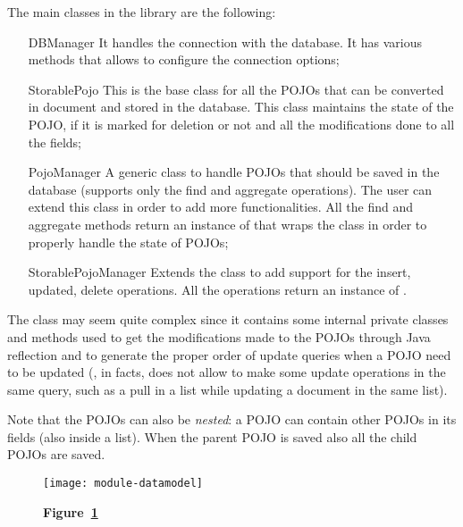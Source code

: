 The main classes in the library are the following:
\begin{itemize}
	\item[DBManager] It handles the connection with the database. It has
		various methods that allows to configure the connection options;
	\item[StorablePojo] This is the base class for all the POJOs that can be
		converted in document and stored in the database. This class
		maintains the state of the POJO, if it is marked for deletion or
		not and all the modifications done to all the fields;
	\item[PojoManager] A generic class to handle POJOs that should
		 be saved in the database (supports only the find
		and aggregate operations). The user can extend this class in
		order to add more functionalities. All the find and aggregate
		methods return an instance of  that wraps the
		 class in order to properly handle the state
		of POJOs;
	\item[StorablePojoManager] Extends the  class to add
		support for the insert, updated, delete operations. All the
		operations return an instance of .
\end{itemize}
The  class may seem quite complex since it contains
some internal private classes and methods used to get the modifications made to
the POJOs through Java reflection and to generate the proper order of update
queries when a POJO need to be updated (\mongodb{}, in facts, does not allow to
make some update operations in the same query, such as a pull in a list while
updating a document in the same list).

Note that the POJOs can also be \emph{nested}: a POJO can contain other POJOs in
its fields (also inside a list). When the parent POJO is saved also all the
child POJOs are saved.

\begin{landscape}
	\begin{figure}[!ht]
		\texttt{[image: module-datamodel]}
		\caption*{\textbf{Figure~\ref{fig:datamodel}}}
		\captionlistentry{}\label{fig:datamodel}
	\end{figure}
\end{landscape}
